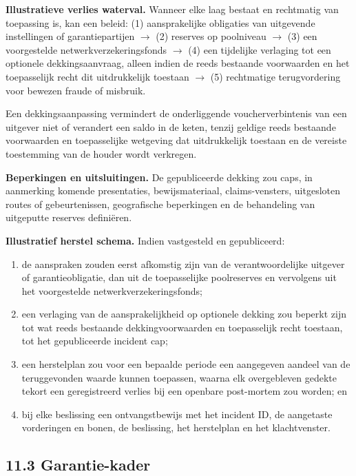 \documentclass[11pt]{article}
\begin{document}
\textbf{Illustratieve verlies waterval.} Wanneer elke laag bestaat en rechtmatig van toepassing is, kan een beleid: (1) aansprakelijke obligaties van uitgevende instellingen of garantiepartijen $\to$ (2) reserves op poolniveau $\to$ (3) een voorgestelde netwerkverzekeringsfonds $\to$ (4) een tijdelijke verlaging tot een optionele dekkingsaanvraag, alleen indien de reeds bestaande voorwaarden en het toepasselijk recht dit uitdrukkelijk toestaan $\to$ (5) rechtmatige terugvordering voor bewezen fraude of misbruik.

Een dekkingsaanpassing vermindert de onderliggende voucherverbintenis van een uitgever niet of verandert een saldo in de keten, tenzij geldige reeds bestaande voorwaarden en toepasselijke wetgeving dat uitdrukkelijk toestaan en de vereiste toestemming van de houder wordt verkregen.

\textbf{Beperkingen en uitsluitingen.} De gepubliceerde dekking zou caps, in aanmerking komende presentaties, bewijsmateriaal, claims-vensters, uitgesloten routes of gebeurtenissen, geografische beperkingen en de behandeling van uitgeputte reserves definiëren.

\textbf{Illustratief herstel schema.} Indien vastgesteld en gepubliceerd:

\begin{enumerate}[leftmargin=*]
\item de aanspraken zouden eerst afkomstig zijn van de verantwoordelijke uitgever of garantieobligatie, dan uit de toepasselijke poolreserves en vervolgens uit het voorgestelde netwerkverzekeringsfonds;
\item een verlaging van de aansprakelijkheid op optionele dekking zou beperkt zijn tot wat reeds bestaande dekkingvoorwaarden en toepasselijk recht toestaan, tot het gepubliceerde incident cap;
\item een herstelplan zou voor een bepaalde periode een aangegeven aandeel van de teruggevonden waarde kunnen toepassen, waarna elk overgebleven gedekte tekort een geregistreerd verlies bij een openbare post-mortem zou worden; en
\item bij elke beslissing een ontvangstbewijs met het incident ID, de aangetaste vorderingen en bonen, de beslissing, het herstelplan en het klachtvenster.
\end{enumerate}
\subsection*{11.3 Garantie-kader}
\end{document}
